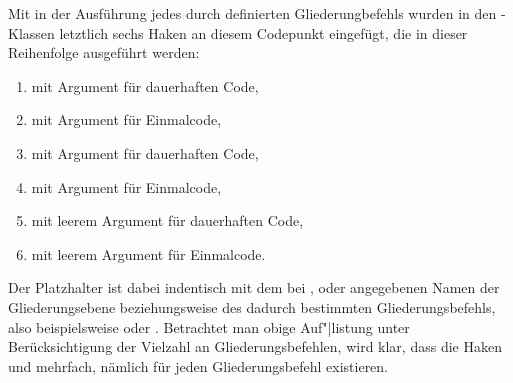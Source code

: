 \begin{Example}
  Mit %
   in der Ausführung jedes
  durch  definierten
  Gliederungbefehls wurden in den \KOMAScript-Klassen letztlich sechs Haken an
  diesem Codepunkt eingefügt, die in dieser Reihenfolge ausgeführt werden:
  \begin{enumerate}
  \item {} mit Argument  für
    dauerhaften Code,
  \item {} mit Argument  für
    Einmalcode,
  \item {} mit Argument  für
    dauerhaften Code,
  \item {} mit Argument  für
    Einmalcode,
  \item {} mit leerem Argument für
    dauerhaften Code,
  \item {} mit leerem Argument für
    Einmalcode.
  \end{enumerate}
  Der Platzhalter  ist dabei indentisch mit dem bei
  ,
   oder
  angegebenen Namen
  der Gliederungsebene beziehungsweise des dadurch bestimmten
  Gliederungsbefehls, also beispielsweise  oder
  . Betrachtet man obige Auf"|listung unter
  Berücksichtigung der Vielzahl an Gliederungsbefehlen,
  wird klar, dass die Haken  und 
  mehrfach, nämlich für jeden Gliederungsbefehl existieren.%
\end{Example}%
%
\EndIndexGroup
\ExampleEndFix


